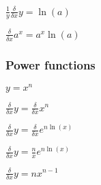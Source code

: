 $\frac{1}{y}\frac{\delta }{\delta x}y=\ln(a)$

$\frac{\delta }{\delta x}a^x=a^x\ln(a)$

\subsubsection{Power functions}

\(y=x^n\)

\(\frac{\delta }{\delta x}y=\frac{\delta }{\delta x}x^n\)

\(\frac{\delta }{\delta x}y=\frac{\delta }{\delta x}e^{n\ln(x)}\)

\(\frac{\delta }{\delta x}y=\frac{n}{x}e^{n\ln(x)}\)

\(\frac{\delta }{\delta x}y=nx^{n-1}\)

